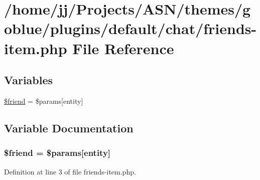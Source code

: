 \hypertarget{themes_2goblue_2plugins_2default_2chat_2friends-item_8php}{}\section{/home/jj/\+Projects/\+A\+S\+N/themes/goblue/plugins/default/chat/friends-\/item.php File Reference}
\label{themes_2goblue_2plugins_2default_2chat_2friends-item_8php}
\subsection*{Variables}
\begin{DoxyCompactItemize}
\item 
\hyperlink{themes_2goblue_2plugins_2default_2chat_2friends-item_8php_a614b5c5dbf84346f452abdd7d0429bce}{\$friend} = \$params\mbox{[}\textquotesingle{}entity\textquotesingle{}\mbox{]}
\end{DoxyCompactItemize}


\subsection{Variable Documentation}
\subsubsection[{\texorpdfstring{\$friend}{$friend}}]{\setlength{\rightskip}{0pt plus 5cm}\$friend = \$params\mbox{[}\textquotesingle{}entity\textquotesingle{}\mbox{]}}\hypertarget{themes_2goblue_2plugins_2default_2chat_2friends-item_8php_a614b5c5dbf84346f452abdd7d0429bce}{}\label{themes_2goblue_2plugins_2default_2chat_2friends-item_8php_a614b5c5dbf84346f452abdd7d0429bce}


Definition at line 3 of file friends-\/item.\+php.

